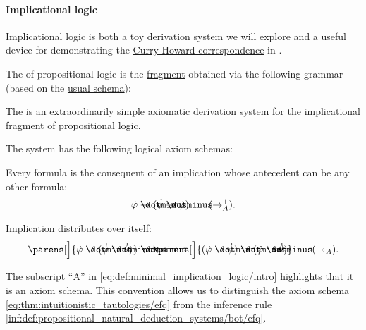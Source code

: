 \paragraph{Implicational logic}\hfill

Implicational logic is both a toy derivation system we will explore and a useful device for demonstrating the \hyperref[con:curry_howard_correspondence]{Curry-Howard correspondence} in .

\begin{definition}\label{def:implicational_propositional_fragment}
  The  of propositional logic is the \hyperref[def:propositional_syntax/fragment]{fragment} obtained via the following grammar (based on the \hyperref[def:propositional_syntax]{usual schema}):
  \begin{bnf*}
     { \bnfor \bnftsq{(} \bnfsp {} \bnfsp \bnftsq{\( \synimplies \)} \bnfsp {} \bnfsp \bnftsq{)}}
  \end{bnf*}
\end{definition}

\begin{definition}\label{def:minimal_implication_logic}
  The  is an extraordinarily simple \hyperref[def:axiomatic_derivation_system]{axiomatic derivation system} for the \hyperref[def:implicational_propositional_fragment]{implicational fragment} of propositional logic.

  The system has the following logical axiom schemas:
  \begin{thmenum}
     Every formula is the consequent of an implication whose antecedent can be any other formula:
    \begin{equation}\label{eq:def:minimal_implication_logic/intro}
      \syn\varphi \synimplies (\syn\psi \synimplies \syn\varphi) \tag{\( \rightarrow_A^+ \)}.
    \end{equation}

     Implication distributes over itself:
    \begin{equation}\label{eq:def:minimal_implication_logic/dist}
      \parens[\Big]{ \syn\varphi \synimplies (\syn\psi \synimplies \syn\theta) } \synimplies \parens[\Big]{ (\syn\varphi \synimplies \syn\psi) \synimplies (\syn\varphi \synimplies \syn\theta)} \tag{\( \twoheadrightarrow_A \)}.
    \end{equation}
  \end{thmenum}
\end{definition}
\begin{comments}
  \item The subscript \enquote{A} in \eqref{eq:def:minimal_implication_logic/intro} highlights that it is an axiom schema. This convention allows us to distinguish the axiom schema \eqref{eq:thm:intuitionistic_tautologies/efq} from the inference rule \ref{inf:def:propositional_natural_deduction_systems/bot/efq}.
\end{comments}

